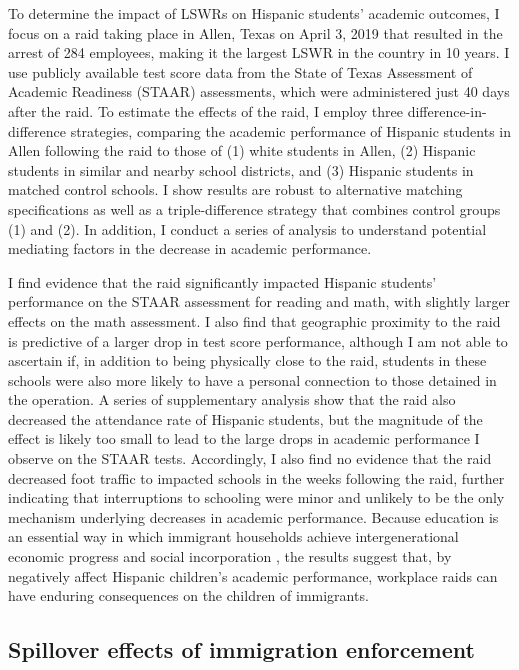 \documentclass[hidelinks,twoside]{article}
\begin{document}
To determine the impact of LSWRs on Hispanic students' academic outcomes, I focus on a raid taking place in Allen, Texas on April 3, 2019 that resulted in the arrest of 284 employees, making it the largest LSWR in the country in 10 years. I use publicly available test score data from the State of Texas Assessment of Academic Readiness (STAAR) assessments, which were administered just 40 days after the raid. To estimate the effects of the raid, I employ three difference-in-difference strategies, comparing the academic performance of Hispanic students in Allen following the raid to those of (1) white students in Allen, (2) Hispanic students in similar and nearby school districts, and (3) Hispanic students in matched control schools. I show results are robust to alternative matching specifications as well as a triple-difference strategy that combines control groups (1) and (2). In addition, I conduct a series of analysis to understand potential mediating factors in the decrease in academic performance.

I find evidence that the raid significantly impacted Hispanic students' performance on the STAAR assessment for reading and math, with slightly larger effects on the math assessment. I also find that geographic proximity to the raid is predictive of a larger drop in test score performance, although I am not able to ascertain if, in addition to being physically close to the raid, students in these schools were also more likely to have a personal connection to those detained in the operation. A series of supplementary analysis show that the raid also decreased the attendance rate of Hispanic students, but the magnitude of the effect is likely too small to lead to the large drops in academic performance I observe on the STAAR tests. Accordingly, I also find no evidence that the raid decreased foot traffic to impacted schools in the weeks following the raid, further indicating that interruptions to schooling were minor and unlikely to be the only mechanism underlying decreases in academic performance. Because education is an essential way in which immigrant households achieve intergenerational economic progress and social incorporation \citep{portes_2001_legacies}, the results suggest that, by negatively affect Hispanic children's academic performance, workplace raids can have enduring consequences on the children of immigrants.

\vspace{1em}
\subsection*{Spillover effects of immigration enforcement}
\vspace{0.5em}
\end{document}
